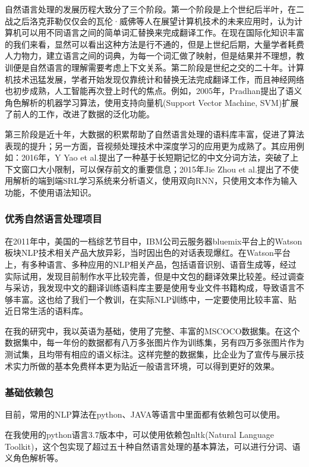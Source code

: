 自然语言处理的发展历程大致分了三个阶段。第一个阶段是上个世纪后半叶，在二战之后洛克菲勒仅仅会的瓦伦·威佛等人在展望计算机技术的未来应用时，认为计算机可以用不同语言之间的简单词汇替换来完成翻译工作。在现在国际化知识丰富的我们来看，显然可以看出这种方法是行不通的，但是上世纪后期，大量学者耗费人力物力，建立语言之间的词典，为每一个词汇做了映射，但是结果并不理想，教训便是自然语言的理解需要考虑上下文关系。第二阶段是世纪之交的二十年。计算机技术迅猛发展，学者开始发现仅靠统计和替换无法完成翻译工作，而且神经网络也初步成熟，人工智能再次登上时代的焦点。例如，2005年，Pradhan提出了语义角色解析的机器学习算法，使用支持向量机(Support Vector Machine, SVM)扩展了前人的工作，改进了数据的泛化功能。

第三阶段是近十年，大数据的积累帮助了自然语言处理的语料库丰富，促进了算法表现的提升；另一方面，音视频处理技术中深度学习的应用更为成熟了。其应用例如：2016年，Y Yao et al.提出了一种基于长短期记忆的中文分词方法，突破了上下文窗口大小限制，可以保存前文的重要信息；2015年Jie Zhou et al.提出了不使用解析的端到端SRL学习系统来分析语义，使用双向RNN，只使用文本作为输入功能，不使用语法知识。

\subsubsection{优秀自然语言处理项目}
在2011年中，美国的一档综艺节目中，IBM公司云服务器bluemix平台上的Watson板块NLP技术相关产品大放异彩，当时因出色的对话表现爆红。在Watson平台上，有多种语言、多种应用的NLP相关产品，包括语音识别、语音生成等，经过实际试用，发现目前制作水平比较完善，但是中文包的翻译效果比较差。经过调查与采访，我发现中文的翻译训练语料库主要是使用专业文件书籍构成，导致语言不够丰富。这也给了我们一个教训，在实际NLP训练中，一定要使用比较丰富、贴近日常生活的语料库。

在我的研究中，我以英语为基础，使用了完整、丰富的MSCOCO数据集。在这个数据集中，每一年份的数据都有八万多张图片作为训练集，另有四万多张图片作为测试集，且均带有相应的语义标注。这样完整的数据集，比企业为了宣传与展示技术实力所做的基本免费样本更为贴近一般语言环境，可以得到更好的效果。

\subsubsection{基础依赖包}
目前，常用的NLP算法在python、JAVA等语言中里面都有依赖包可以使用。

在我使用的python语言3.7版本中，可以使用依赖包nltk(Natural Language Toolkit)，这个包实现了超过五十种自然语言处理的基本算法，可以进行分词、语义角色解析等。

